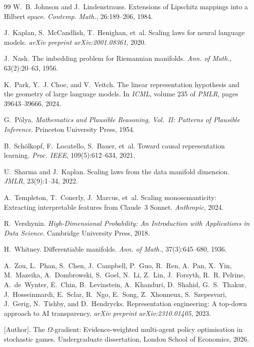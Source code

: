 \documentclass[11pt,a4paper]{article}
\theoremstyle{plain}
\theoremstyle{definition}
\theoremstyle{remark}
\begin{document}
\begin{thebibliography}{99}
W.~B. Johnson and J.~Lindenstrauss.
\newblock Extensions of {L}ipschitz mappings into a {H}ilbert space.
\newblock \emph{Contemp. Math.}, 26:189--206, 1984.

J.~Kaplan, S.~McCandlish, T.~Henighan, et~al.
\newblock Scaling laws for neural language models.
\newblock \emph{arXiv preprint arXiv:2001.08361}, 2020.

J.~Nash.
\newblock The imbedding problem for {R}iemannian manifolds.
\newblock \emph{Ann. of Math.}, 63(2):20--63, 1956.

K.~Park, Y.~J. Choe, and V.~Veitch.
\newblock The linear representation hypothesis and the geometry of large
  language models.
\newblock In \emph{ICML}, volume 235 of \emph{PMLR}, pages 39643--39666, 2024.

G.~P\'olya.
\newblock \emph{Mathematics and Plausible Reasoning, Vol.~II: Patterns of
  Plausible Inference}.
\newblock Princeton University Press, 1954.

B.~Sch\"olkopf, F.~Locatello, S.~Bauer, et~al.
\newblock Toward causal representation learning.
\newblock \emph{Proc. IEEE}, 109(5):612--634, 2021.

U.~Sharma and J.~Kaplan.
\newblock Scaling laws from the data manifold dimension.
\newblock \emph{JMLR}, 23(9):1--34, 2022.

A.~Templeton, T.~Conerly, J.~Marcus, et~al.
\newblock Scaling monosemanticity: Extracting interpretable features from
  {C}laude~3 {S}onnet.
\newblock \emph{Anthropic}, 2024.

R.~Vershynin.
\newblock \emph{High-Dimensional Probability: An Introduction with Applications
  in Data Science}.
\newblock Cambridge University Press, 2018.

H.~Whitney.
\newblock Differentiable manifolds.
\newblock \emph{Ann. of Math.}, 37(3):645--680, 1936.

A.~Zou, L.~Phan, S.~Chen, J.~Campbell, P.~Guo, R.~Ren, A.~Pan, X.~Yin,
  M.~Mazeika, A.~Dombrowski, S.~Goel, N.~Li, Z.~Lin, J.~Forsyth, R.~R.
  Pelrine, A.~de~Wynter, E.~Chin, B.~Levinstein, A.~Khanduri, D.~Shahid,
  G.~S.~Thakur, J.~Hosseinmardi, E.~Sclar, R.~Ngo, E.~Song, Z.~Xhonneux,
  S.~Szepesvari, J.~Gerig, N.~Tishby, and D.~Hendrycks.
\newblock Representation engineering: A top-down approach to {AI} transparency.
\newblock \emph{arXiv preprint arXiv:2310.01405}, 2023.

{[Author]}.
\newblock The {$\Omega$}-gradient: Evidence-weighted multi-agent policy
  optimisation in stochastic games.
\newblock Undergraduate dissertation, London School of Economics, 2026.

\end{thebibliography}
\end{document}
